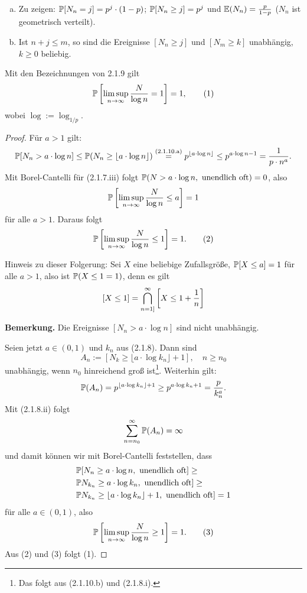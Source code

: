 \begin{prgp}[Aufgabe]
  \begin{enumerate}[(a)]
  \item Zu zeigen: $\mathbb{P}[N_n = j] = p^j \cdot (1-p)$; $\mathbb{P}[N_n \ge j] = p^j$ und
    $\mathbb{E}(N_n) = \frac{p}{1-p}$ ($N_n$ ist geometrisch verteilt).
  \item Ist $n+j \le m$, so sind die Ereignisse $[N_n \ge j]$ und $[N_m \ge
    k]$ unabhängig, $k \ge 0$ beliebig.
  \end{enumerate}
\end{prgp}

\begin{thm}
  Mit den Bezeichnungen von 2.1.9 gilt
  \[ \mathbb{P} \left[ \limsup_{n \to \infty} \frac{N}{\log n} = 1  \right] = 1,
    \tag{1} \]
  wobei $\log := \log_{1/p}$.
\end{thm}

\begin{proof}
  Für $a > 1$ gilt:
  \[ \mathbb{P} [N_n > a \cdot \log n] \le \mathbb{P}( N_n \ge \lfloor a \cdot \log n
    \rfloor) \overset{\text{(2.1.10.a)}}{=} p^{\lfloor a \cdot \log n \rfloor} \le p^{a
      \cdot \log n - 1} = \frac{1}{p \cdot n^a}. \]
  Mit Borel-Cantelli für (2.1.7.iii) folgt $\mathbb{P}( N > a \cdot \log n, \text{
    unendlich oft}) = 0$, also 
  \[ \mathbb{P} \left[  \limsup_{n \to \infty} \frac{N}{\log n} \le a \right] = 1 \]
  für alle $a > 1$. Daraus folgt
  \[ \mathbb{P} \left[ \limsup_{n \to \infty} \frac{N}{\log n} \le 1 \right] = 1.
    \tag{2} \]

  Hinweis zu dieser Folgerung: Sei $X$ eine beliebige Zufallsgröße, $\mathbb{P} [X \le
  a] = 1$ für alle $a > 1$, also ist $\mathbb{P}( X \le 1 = 1)$, denn es gilt
  \[ [ X \le 1 ] = \bigcap_{n=1]}^\infty \left[ X \le 1 + \frac{1}{n} \right] \]

  \textbf{Bemerkung.} Die Ereignisse $[N_n > a \cdot \log n]$ sind nicht
  unabhängig.

  Seien jetzt $a \in (0,1)$ und $k_n$ aus (2.1.8). Dann sind
  \[ A_n := [ N_k \ge \lfloor a \cdot \log k_n \rfloor + 1 ], \quad n \ge n_0 \]
  unabhängig, wenn $n_0$ hinreichend groß ist\footnote{%
    Das folgt aus (2.1.10.b) und (2.1.8.i).}.
  Weiterhin gilt:
  \[ \mathbb{P}(A_n) = p^{\lfloor a \cdot \log k_n \rfloor + 1} \ge p^{a \cdot \log k_n
      + 1} = \frac{p}{k_n^a}. \]
  Mit (2.1.8.ii) folgt
  \[ \sum_{n=n_0}^\infty \mathbb{P}(A_n) = \infty \]
  und damit können wir mit Borel-Cantelli feststellen, dass
  \[ \begin{aligned}
      &\mathbb{P} [ N_n \ge a \cdot \log n, \text{ unendlich oft}] \ge \\
      &\mathbb{P} N_{k_n} \ge a \cdot \log k_n, \text{ unendlich oft}] \ge \\
      &\mathbb{P} N_{k_n} \ge \lfloor a \cdot \log k_n \rfloor + 1 , \text{ unendlich
        oft}] = 1
    \end{aligned} \]
  für alle $a \in (0,1)$, also
  \[ \mathbb{P} \left[ \limsup_{n \to \infty} \frac{N}{\log n} \ge 1 \right] = 1.
    \tag{3} \]
  Aus (2) und (3) folgt (1).
\end{proof}

